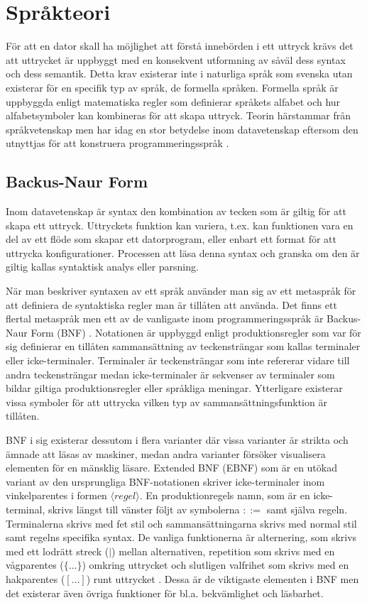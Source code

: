 \section{Språkteori}

För att en dator skall ha möjlighet att förstå innebörden i ett uttryck krävs
det att uttrycket är uppbyggt med en konsekvent utformning av såväl dess
syntax och dess semantik. Detta krav existerar inte i naturliga språk som
svenska utan existerar för en specifik typ av språk, de formella språken.
Formella språk är uppbyggda enligt matematiska regler som definierar språkets
alfabet och hur alfabetsymboler kan kombineras för att skapa uttryck. Teorin
härstammar från språkvetenskap men har idag en stor betydelse inom
datavetenskap eftersom den utnyttjas för att konstruera programmeringsspråk
\citep[s. 41]{sm09}.

\subsection{Backus-Naur Form}

Inom datavetenskap är syntax den kombination av tecken som är giltig för att
skapa ett uttryck. Uttryckets funktion kan variera, t.ex. kan funktionen
vara en del av ett flöde som skapar ett datorprogram, eller enbart ett format
för att uttrycka konfigurationer. Processen att läsa denna syntax och granska
om den är giltig kallas syntaktisk analys eller parsning.

När man beskriver syntaxen av ett språk använder man sig av ett metaspråk för
att definiera de syntaktiska regler man är tillåten att använda. Det finns ett
flertal metaspråk men ett av de vanligaste inom programmeringsspråk är
Backus-Naur Form (BNF) \citep[s. 27]{gd08}. Notationen är uppbyggd enligt
produktionsregler som var för sig definierar en tillåten sammansättning av
teckensträngar som kallas terminaler eller icke-terminaler. Terminaler är
teckensträngar som inte refererar vidare till andra teckensträngar medan
icke-terminaler är sekvenser av terminaler som bildar giltiga
produktionsregler eller språkliga meningar. Ytterligare existerar vissa
symboler för att uttrycka vilken typ av sammansättningsfunktion är tillåten.

BNF i sig existerar dessutom i flera varianter där vissa varianter är strikta och
ämnade att läsas av maskiner, medan andra varianter försöker visualisera elementen
för en mänsklig läsare. Extended BNF (EBNF) som är en utökad variant av den
ursprungliga BNF-notationen skriver icke-terminaler inom vinkelparentes i
formen ${\langle}regel{\rangle}$. En produktionregels namn, som är en
icke-terminal,
skrivs längst till vänster följt av symbolerna $::=$ samt själva regeln.
Terminalerna skrivs med fet stil och sammansättningarna skrivs med normal
stil samt regelns specifika syntax. De vanliga funktionerna är alternering, som
skrivs med ett lodrätt streck ($|$) mellan alternativen, repetition som skrivs
med en vågparentes ($\{ \ldots \}$) omkring uttrycket och slutligen
valfrihet som skrivs med en hakparentes ($[ \ldots ]$) runt uttrycket
\citep[s. 28]{gd08}. Dessa är de viktigaste elementen i BNF men det existerar
även övriga funktioner för bl.a. bekvämlighet och läsbarhet.

